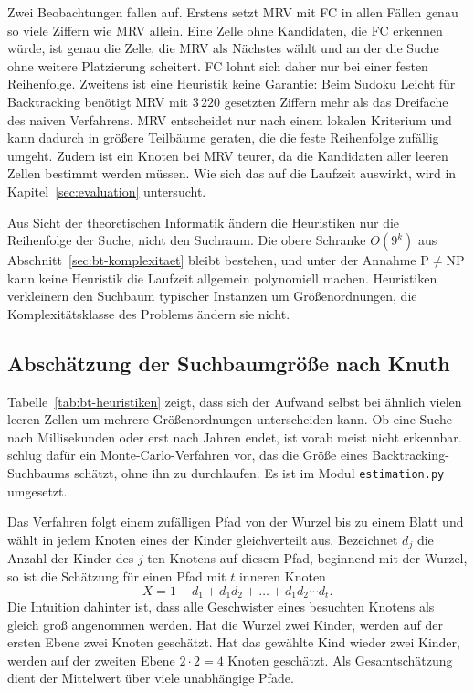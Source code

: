 Zwei Beobachtungen fallen auf. 
Erstens setzt \ac{MRV} mit \ac{FC} in allen Fällen genau so viele Ziffern wie \ac{MRV} allein. 
Eine Zelle ohne Kandidaten, die \ac{FC} erkennen würde, ist genau die Zelle, die \ac{MRV} als Nächstes wählt 
und an der die Suche ohne weitere Platzierung scheitert. 
\ac{FC} lohnt sich daher nur bei einer festen Reihenfolge. 
Zweitens ist eine Heuristik keine Garantie: Beim Sudoku \glqq Leicht für Backtracking\grqq{} 
benötigt \ac{MRV} mit $3\,220$ gesetzten Ziffern mehr als das Dreifache des naiven Verfahrens. 
\ac{MRV} entscheidet nur nach einem lokalen Kriterium und kann dadurch in größere Teilbäume geraten, 
die die feste Reihenfolge zufällig umgeht. 
Zudem ist ein Knoten bei \ac{MRV} teurer, da die Kandidaten aller leeren Zellen bestimmt werden müssen. 
Wie sich das auf die Laufzeit auswirkt, wird in Kapitel~\ref{sec:evaluation} untersucht.

Aus Sicht der theoretischen Informatik ändern die Heuristiken nur die Reihenfolge der Suche, nicht den Suchraum. 
Die obere Schranke $O(9^k)$ aus Abschnitt~\ref{sec:bt-komplexitaet} bleibt bestehen, 
und unter der Annahme $\mathrm{P} \neq \mathrm{NP}$ kann keine Heuristik die Laufzeit allgemein polynomiell machen. 
Heuristiken verkleinern den Suchbaum typischer Instanzen um Größenordnungen, die Komplexitätsklasse des Problems ändern sie nicht.

\subsection{Abschätzung der Suchbaumgröße nach Knuth}\label{sec:bt-knuth}

Tabelle~\ref{tab:bt-heuristiken} zeigt, dass sich der Aufwand selbst bei ähnlich vielen leeren Zellen 
um mehrere Größenordnungen unterscheiden kann. 
Ob eine Suche nach Millisekunden oder erst nach Jahren endet, ist vorab meist nicht erkennbar. 
\textcite{knuth1975} schlug dafür ein Monte-Carlo-Verfahren vor, das die Größe eines Backtracking-Suchbaums schätzt, 
ohne ihn zu durchlaufen. Es ist im Modul \texttt{estimation.py} umgesetzt.

Das Verfahren folgt einem zufälligen Pfad von der Wurzel bis zu einem Blatt 
und wählt in jedem Knoten eines der Kinder gleichverteilt aus. 
Bezeichnet $d_j$ die Anzahl der Kinder des $j$-ten Knotens auf diesem Pfad, 
beginnend mit der Wurzel, so ist die Schätzung für einen Pfad mit $t$ inneren Knoten
\begin{equation}
	X = 1 + d_1 + d_1 d_2 + \dots + d_1 d_2 \cdots d_t.
\end{equation}
Die Intuition dahinter ist, dass alle Geschwister eines besuchten Knotens als gleich groß angenommen werden. 
Hat die Wurzel zwei Kinder, werden auf der ersten Ebene zwei Knoten geschätzt. 
Hat das gewählte Kind wieder zwei Kinder, werden auf der zweiten Ebene $2 \cdot 2 = 4$ Knoten geschätzt. 
Als Gesamtschätzung dient der Mittelwert über viele unabhängige Pfade.

